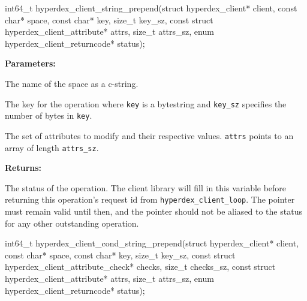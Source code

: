 \funcsep
{}
\begin{ccode}
int64_t hyperdex_client_string_prepend(struct hyperdex_client* client,
                const char* space,
                const char* key, size_t key_sz,
                const struct hyperdex_client_attribute* attrs, size_t attrs_sz,
                enum hyperdex_client_returncode* status);
\end{ccode}
\funcdesc 

\noindent\textbf{Parameters:}
\begin{description}[labelindent=\widthof{{\texttt{attrs}, \texttt{attrs\_sz}}},leftmargin=*,noitemsep,nolistsep,align=right]
\item[\texttt{space}] The name of the space as a c-string.
\item[\texttt{key}, \texttt{key\_sz}] The key for the operation where \texttt{key} is a bytestring and \texttt{key\_sz} specifies the number of bytes in \texttt{key}.
\item[\texttt{attrs}, \texttt{attrs\_sz}] The set of attributes to modify and their respective values.  \texttt{attrs} points to an array of length \texttt{attrs\_sz}.
\end{description}

\noindent\textbf{Returns:}
\begin{description}[labelindent=\widthof{{\texttt{status}}},leftmargin=*,noitemsep,nolistsep,align=right]
\item[\texttt{status}] The status of the operation.  The client library will fill in this variable before returning this operation's request id from \texttt{hyperdex\_client\_loop}.  The pointer must remain valid until then, and the pointer should not be aliased to the status for any other outstanding operation.
\end{description}

\funcsep
{}
\begin{ccode}
int64_t hyperdex_client_cond_string_prepend(struct hyperdex_client* client,
                const char* space,
                const char* key, size_t key_sz,
                const struct hyperdex_client_attribute_check* checks, size_t checks_sz,
                const struct hyperdex_client_attribute* attrs, size_t attrs_sz,
                enum hyperdex_client_returncode* status);
\end{ccode}
\funcdesc 

